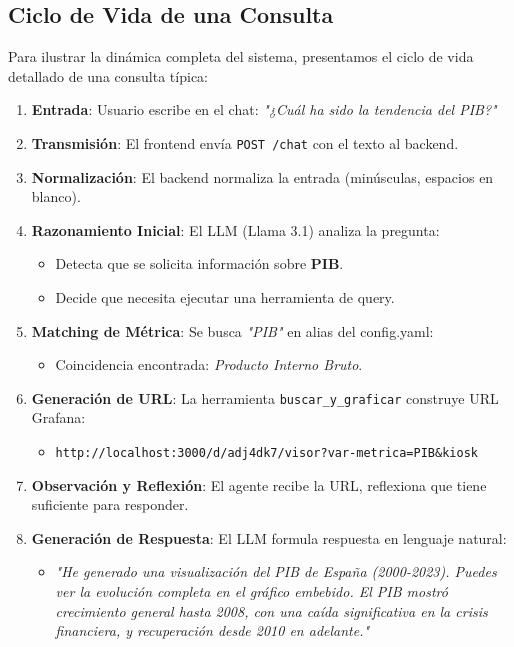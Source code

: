 \documentclass[11pt, a4paper]{report}
\begin{document}
\subsection{Ciclo de Vida de una Consulta}

Para ilustrar la dinámica completa del sistema, presentamos el ciclo de vida detallado de una consulta típica:

\begin{enumerate}
    \item \textbf{Entrada}: Usuario escribe en el chat: \textit{"¿Cuál ha sido la tendencia del PIB?"}
    
    \item \textbf{Transmisión}: El frontend envía \texttt{POST /chat} con el texto al backend.
    
    \item \textbf{Normalización}: El backend normaliza la entrada (minúsculas, espacios en blanco).
    
    \item \textbf{Razonamiento Inicial}: El LLM (Llama 3.1) analiza la pregunta:
    \begin{itemize}
        \item Detecta que se solicita información sobre \textbf{PIB}.
        \item Decide que necesita ejecutar una herramienta de query.
    \end{itemize}
    
    \item \textbf{Matching de Métrica}: Se busca \textit{"PIB"} en alias del config.yaml:
    \begin{itemize}
        \item Coincidencia encontrada: \textit{Producto Interno Bruto}.
    \end{itemize}
    
    \item \textbf{Generación de URL}: La herramienta \texttt{buscar\_y\_graficar} construye URL Grafana:
    \begin{itemize}
        \item \texttt{http://localhost:3000/d/adj4dk7/visor?var-metrica=PIB\&kiosk}
    \end{itemize}
    
    \item \textbf{Observación y Reflexión}: El agente recibe la URL, reflexiona que tiene suficiente para responder.
    
    \item \textbf{Generación de Respuesta}: El LLM formula respuesta en lenguaje natural:
    \begin{itemize}
        \item \textit{"He generado una visualización del PIB de España (2000-2023). Puedes ver la evolución completa en el gráfico embebido. El PIB mostró crecimiento general hasta 2008, con una caída significativa en la crisis financiera, y recuperación desde 2010 en adelante."}
    \end{itemize}
    

\end{enumerate}
\end{document}
